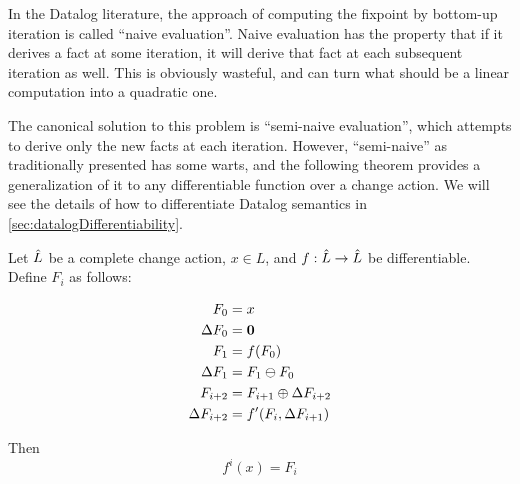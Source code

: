 In the Datalog literature, the approach of computing the fixpoint by bottom-up
iteration is called ``naive evaluation''. Naive evaluation has the property that
if it derives a fact at some iteration, it will derive that fact at each
subsequent iteration as well. This is obviously wasteful, and can turn what
should be a linear computation into a quadratic one.

The canonical solution to this problem is ``semi-naive evaluation'', which
attempts to derive only the new facts at each iteration. However, ``semi-naive''
as traditionally presented has some warts, and
the following theorem provides a generalization of it to any differentiable function over a
change action. We will see the details of how to differentiate Datalog
semantics in \cref{sec:datalogDifferentiability}.


\begin{thm}
\label{thm:diffIter}
  Let $\hat{L}$ be a complete change action, $x \in L$, and $f: \hat{L} \rightarrow \hat{L}$ be differentiable. Define $F_i$ as follows:

  \begin{align*}
  F_0 &= x\\
  \Delta F_0 &= \textbf{0} \\
  F_1 &= f(F_0)\\
  \Delta F_1 &= F_1 \ominus F_0 \\
  F_{i+2} &= F_{i+1} \oplus \Delta F_{i+2} \\
  \Delta F_{i+2} &= f'(F_i, \Delta F_{i+1}) \\
  \end{align*}

  Then 
  $$f^i(x) = F_i$$
\end{thm}


